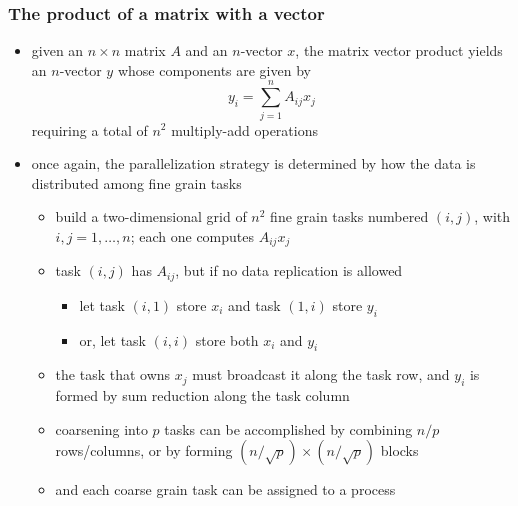 \begin{frame}[fragile]
%
  \frametitle{The product of a matrix with a vector}
%
  \begin{itemize}
%
  \item given an $n \times n$ matrix $A$ and an $n$-vector $x$, the matrix vector product
    yields an $n$-vector $y$ whose components are given by
    \begin{equation}
      y_{i} = \sum_{j=1}^{n} A_{ij} x_{j}
    \end{equation}
    requiring a total of $n^{2}$ multiply-add operations
%
  \item once again, the parallelization strategy is determined by how the data is distributed
    among fine grain tasks
    \begin{itemize}
    \item build a two-dimensional grid of $n^{2}$ fine grain tasks numbered $(i,j)$, with $i,j
      = 1, \ldots, n$; each one computes $A_{ij}x_{j}$
    \item task $(i,j)$ has $A_{ij}$, but if no data replication is allowed
      \begin{itemize}
      \item let task $(i,1)$ store $x_{i}$ and task $(1,i)$ store $y_{i}$
      \item or, let task $(i,i)$ store both $x_{i}$ and $y_{i}$
      \end{itemize}
    \item the task that owns $x_{j}$ must broadcast it along the  task row, and $y_{i}$
      is formed by sum reduction along the  task column
    \item coarsening into $p$ tasks can be accomplished by combining $n/p$ rows/columns, or by
      forming $(n/\sqrt{p}) \times (n/\sqrt{p})$ blocks
    \item and each coarse grain task can be assigned to a process
    \end{itemize}
%
  \end{itemize}
%
\end{frame}

